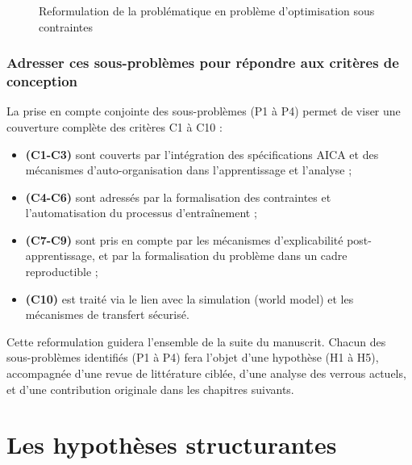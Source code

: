 \documentclass[ twoside,openright,titlepage,numbers=noenddot,headinclude,%
                footinclude=true,cleardoublepage=empty,abstractoff, %
                BCOR=5mm,paper=a4,fontsize=11pt,%
                french,american,%
                ]{scrreprt}
\begin{document}
\begin{figure}[H]
    \centering
    \caption{Reformulation de la problématique en problème d'optimisation sous contraintes}
    \label{fig:constrained_optimization_overview}
\end{figure}

\subsection{Adresser ces sous-problèmes pour répondre aux critères de conception}

La prise en compte conjointe des sous-problèmes (P1 à P4) permet de viser une couverture complète des critères C1 à C10 :

\begin{itemize}
    \item \textbf{(C1-C3)} sont couverts par l'intégration des spécifications AICA et des mécanismes d'auto-organisation dans l'apprentissage et l'analyse ;
    \item \textbf{(C4-C6)} sont adressés par la formalisation des contraintes et l'automatisation du processus d'entraînement ;
    \item \textbf{(C7-C9)} sont pris en compte par les mécanismes d'explicabilité post-apprentissage, et par la formalisation du problème dans un cadre reproductible ;
    \item \textbf{(C10)} est traité via le lien avec la simulation (world model) et les mécanismes de transfert sécurisé.
\end{itemize}

Cette reformulation guidera l'ensemble de la suite du manuscrit. Chacun des sous-problèmes identifiés (P1 à P4) fera l'objet d'une hypothèse (H1 à H5), accompagnée d'une revue de littérature ciblée, d'une analyse des verrous actuels, et d'une contribution originale dans les chapitres suivants.



\chapter{Les hypothèses structurantes}\label{chap:hypotheses}
\end{document}
